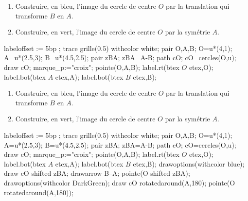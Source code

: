 \begin{exercice*}
    \begin{enumerate}
        \item Construire, en bleu, l'image du cercle de centre $O$ par la translation qui transforme $B$ en $A$.
        \item Construire, en vert, l'image du cercle de centre $O$ par la symétrie $A$.
    \end{enumerate}
    \medskip
    \begin{Geometrie}[CoinHD={(6u,7u)}]
        labeloffset := 5bp ;
        trace grille(0.5) withcolor white;
        pair O,A,B;
        O=u*(4,1);
        A=u*(2.5,3);
        B=u*(4.5,2.5);
        pair zBA;
        zBA=A-B;
        path cO;
        cO=cercles(O,u);
        draw cO;
        marque_p:="croix";
        pointe(O,A,B);
        label.rt(btex $O$ etex,O);        
        label.bot(btex $A$ etex,A);
        label.bot(btex $B$ etex,B);
    \end{Geometrie}
\end{exercice*}
\begin{corrige}
    \begin{enumerate}
        \item Construire, en bleu, l'image du cercle de centre $O$ par la translation qui transforme $B$ en $A$.
        \item Construire, en vert, l'image du cercle de centre $O$ par la symétrie $A$.
    \end{enumerate}
    \medskip
    \begin{Geometrie}[CoinHD={(6u,7u)}]
        labeloffset := 5bp ;
        trace grille(0.5) withcolor white;
        pair O,A,B;
        O=u*(4,1);
        A=u*(2.5,3);
        B=u*(4.5,2.5);
        pair zBA;
        zBA=A-B;
        path cO;
        cO=cercles(O,u);
        draw cO;
        marque_p:="croix";
        pointe(O,A,B);
        label.rt(btex $O$ etex,O);        
        label.bot(btex $A$ etex,A);
        label.bot(btex $B$ etex,B);
        drawoptions(withcolor blue);
        draw cO shifted zBA;
        drawarrow B--A;
        pointe(O shifted zBA);
        drawoptions(withcolor DarkGreen);
        draw cO rotatedaround(A,180);
        pointe(O rotatedaround(A,180));
    \end{Geometrie}
\end{corrige}

